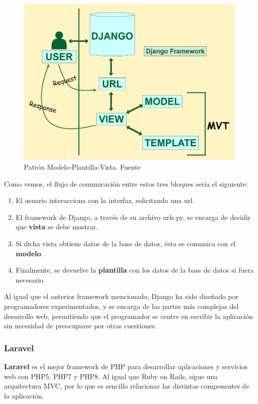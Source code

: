        \begin{figure}[H]
            \centering
            \includegraphics[scale=0.22]{imagenes/mvt.png}
            \caption[Patrón Modelo-Plantilla-Vista]{Patrón Modelo-Plantilla-Vista. Fuente \cite{mvt}}
            \label{fig:mvt}
        \end{figure}

    Como vemos, el flujo de comunicación entre estos tres bloques sería el siguiente:
        
       \begin{enumerate}
           \item El usuario interacciona con la interfaz, solicitando una url.
           \item El framework de Django, a través de su archivo urls.py, se encarga de
           decidir que \textbf{vista} se debe mostrar.
           \item Si dicha vista obtiene datos de la base de datos, ésta se comunica con el 
           \textbf{modelo}.
           \item Finalmente, se devuelve la \textbf{plantilla} con los datos de la base de datos si
           fuera necesario.
       \end{enumerate}

    Al igual que el anterior framework mencionado, Django ha sido diseñado por programadores
    experimentados, y se encarga de las partes más complejas del desarrollo web, permitiendo
    que el programador se centre en escribir la aplicación sin necesidad de preocuparse
    por otras cuestiones.

    \subsubsection{Laravel}
    \textbf{Laravel} \cite{laravel} es el mejor framework de PHP para desarrollar aplicaciones
    y servicios web con PHP5, PHP7 y PHP8. Al igual que Ruby on Rails, sigue una arquitectura 
    MVC, por lo que es sencillo relacionar las distintas componentes de la aplicación.\\

